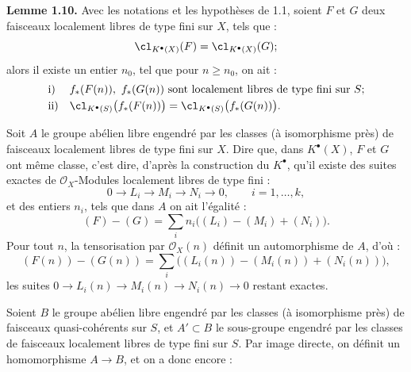 \textbf{Lemme 1.10.} Avec les notations et les hypothèses de 1.1, soient \(F\) et \(G\) deux faisceaux localement libres de type fini sur \(X\), tels que :
\[
  \cl_{K^{\bullet}(X)}(F)=\cl_{K^{\bullet}(X)}(G);
\]
alors il existe un entier \(n_0\), tel que pour \(n\geq n_0\), on ait :
\[
\begin{array}{ll}
\text{i)}& f_*(F(n)),\ f_*(G(n))\text{ sont localement libres de type fini sur }S;\\[1mm]
\text{ii)}& \cl_{K^{\bullet}(S)}\bigl(f_*(F(n))\bigr)=\cl_{K^{\bullet}(S)}\bigl(f_*(G(n))\bigr).
\end{array}
\]

Soit \(A\) le groupe abélien libre engendré par les classes (à isomorphisme près) de faisceaux localement libres de type fini sur \(X\). Dire que, dans \(K^{\bullet}(X)\), \(F\) et \(G\) ont même classe, c'est dire, d'après la construction du \(K^{\bullet}\), qu'il existe des suites exactes de \(\mathcal O_X\)-Modules localement libres de type fini :
\[
  0\longrightarrow L_i\longrightarrow M_i\longrightarrow N_i\longrightarrow 0,
  \qquad i=1,\ldots,k,
\]
et des entiers \(n_i\), tels que dans \(A\) on ait l'égalité :
\[
  (F)-(G)=\sum_i n_i\bigl((L_i)-(M_i)+(N_i)\bigr).
\]
Pour tout \(n\), la tensorisation par \(\mathcal O_X(n)\) définit un automorphisme de \(A\), d'où :
\[
  (F(n))-(G(n))=\sum_i \bigl((L_i(n))-(M_i(n))+(N_i(n))\bigr),
\]
les suites \(0\to L_i(n)\to M_i(n)\to N_i(n)\to0\) restant exactes.

Soient \(B\) le groupe abélien libre engendré par les classes (à isomorphisme près) de faisceaux quasi-cohérents sur \(S\), et \(A'\subset B\) le sous-groupe engendré par les classes de faisceaux localement libres de type fini sur \(S\). Par image directe, on définit un homomorphisme \(A\to B\), et on a donc encore :
